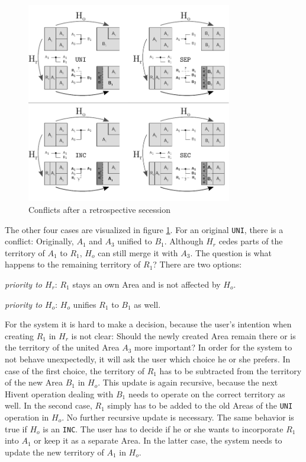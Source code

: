 \begin{figure}[ht]
\vspace{1em}
  \centering
  \includegraphics[width=0.8\textwidth]{graphics/development/editing_hivent_data/retrospective_updates/SEC}
  \caption{Conflicts after a retrospective secession}
  \label{fig:update_conflict_SEC}
\end{figure}

The other four cases are visualized in figure \ref{fig:update_conflict_SEC}. For an original \texttt{UNI}, there is a conflict: Originally, $A_1$ and $A_3$ unified to $B_1$. Although $H_r$ cedes parts of the territory of $A_1$ to $R_1$, $H_o$ can still merge it with $A_3$. The question is what happens to the remaining territory of $R_1$? There are two options:
\begin{compactenum}
  \item
  \emph{priority to $H_r$}:
  $R_1$ stays an own Area and is not affected by $H_o$.
  \item
  \emph{priority to $H_o$}:
  $H_o$ unifies $R_1$ to $B_1$ as well.
\end{compactenum}

For the system it is hard to make a decision, because the user's intention when creating $R_1$ in $H_r$ is not clear: Should the newly created Area remain there or is the territory of the united Area $A_3$ more important? In order for the system to not behave unexpectedly, it will ask the user which choice he or she prefers. In case of the first choice, the territory of $R_1$ has to be subtracted from the territory of the new Area $B_1$ in $H_o$. This update is again recursive, because the next Hivent operation dealing with $B_1$ needs to operate on the correct territory as well. In the second case, $R_1$ simply has to be added to the old Areas of the \texttt{UNI} operation in $H_o$. No further recursive update is necessary. The same behavior is true if $H_o$ is an \texttt{INC}. The user has to decide if he or she wants to incorporate $R_1$ into $A_1$ or keep it as a separate Area. In the latter case, the system needs to update the new territory of $A_1$ in $H_o$.

